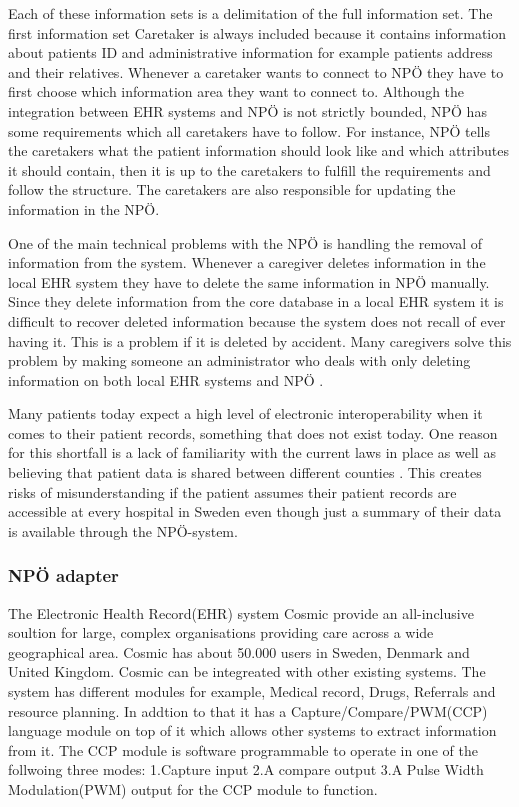 \documentclass[14pt]{article}
\begin{document}
Each of these information sets is a delimitation of the full information set. The first information set Caretaker is always included because it contains information about patients ID and administrative information for example patients address and their relatives. Whenever a caretaker wants to connect to NPÖ they have to first choose which information area they want to connect to. Although the integration between \gls{EHR} systems and NPÖ is not strictly bounded, NPÖ has some requirements which all caretakers have to follow. For instance, NPÖ tells the caretakers what the patient information should look like and which attributes it should contain, then it is up to the caretakers to fulfill the requirements and follow the structure. The caretakers are also responsible for updating the information in the NPÖ. 

One of the main technical problems with the NPÖ is handling the removal of information from the system. Whenever a caregiver deletes information in the local \gls{EHR} system they have to delete the same information in NPÖ manually. Since they delete information from the core database in a local \gls{EHR} system it is difficult to recover deleted information because the system does not recall of ever having it. This is a problem if it is deleted by accident. Many caregivers solve this problem by making someone an administrator who deals with only deleting information on both local \gls{EHR} systems and NPÖ  \cite{ViktorJernelov}.

Many patients today expect a high level of electronic interoperability when it comes to their patient records\cite{EPJ2}, something that does not exist today. One reason for this shortfall is a lack of familiarity with the current laws in place as well as believing that patient data is shared between different counties \cite{EPJ2}. This creates risks of misunderstanding if the patient assumes their patient records are accessible at every hospital in Sweden even though just a summary of their data is available through the NPÖ-system.
\label{sec:npoInterv}
\subsubsection{NPÖ adapter}
\label{sec:npoIntervi}

The Electronic Health Record(\gls{EHR}) system Cosmic provide an all-inclusive soultion for large, complex organisations providing care across a wide geographical area. Cosmic has about 50.000 users in Sweden, Denmark and United Kingdom. Cosmic can be integreated with other existing systems. The system has different modules for example, Medical record, Drugs, Referrals and resource planning. In addtion to that it has a Capture/Compare/PWM(CCP) language module on top of it which allows other systems to extract information from it. The CCP module is software programmable to operate in one of the follwoing three modes: 1.Capture input 2.A compare output 3.A Pulse Width Modulation(PWM) output for the CCP module to function. 
\end{document}
